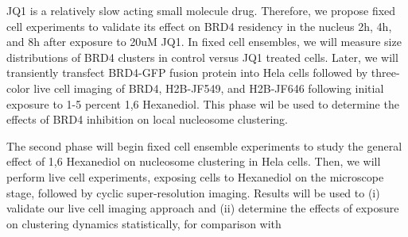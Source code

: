 \documentclass{ucetd}
\begin{document}
JQ1 is a relatively slow acting small molecule drug. Therefore, we propose fixed cell experiments to validate its effect on BRD4 residency in the nucleus 2h, 4h, and 8h after exposure to 20uM JQ1. In fixed cell ensembles, we will measure size distributions of BRD4 clusters in control versus JQ1 treated cells. Later, we will transiently transfect BRD4-GFP fusion protein into Hela cells followed by three-color live cell imaging of BRD4, H2B-JF549, and H2B-JF646 following initial exposure to 1-5 percent 1,6 Hexanediol. This phase wil be used to determine the effects of BRD4 inhibition on local nucleosome clustering.

The second phase will begin fixed cell ensemble experiments to study the general effect of 1,6 Hexanediol on nucleosome clustering in Hela cells. Then, we will perform live cell experiments, exposing cells to Hexanediol on the microscope stage, followed by cyclic super-resolution imaging. Results will be used to (i) validate our live cell imaging approach and (ii) determine the effects of exposure on clustering dynamics statistically, for comparison with 
\end{document}

